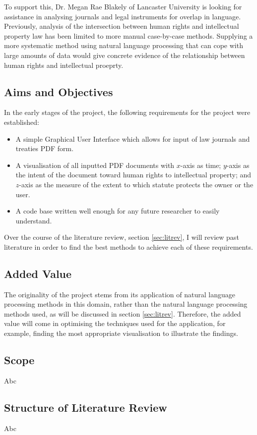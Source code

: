			To support this, Dr. Megan Rae Blakely of Lancaster University is looking for assistance in analysing journals and legal instruments for overlap in language. Previously, analysis of the intersection between human rights and intellectual property law has been limited to more manual case-by-case methods. Supplying a more systematic method using natural language processing that can cope with large amounts of data would give concrete evidence of the relationship between human rights and intellectual proeprty. 
		\subsection{Aims and Objectives}
			In the early stages of the project, the following requirements for the project were established:
			\begin{itemize}
				\item A simple Graphical User Interface which allows for input of law journals and treaties PDF form.
				\item A visualisation of all inputted PDF documents with $x$-axis as time; $y$-axis as the intent of the document toward human rights to intellectual property; and $z$-axis as the measure of the extent to which statute protects the owner or the user.
				\item A code base written well enough for any future researcher to easily understand.
			\end{itemize}
			Over the course of the literature review, section \ref{sec:litrev}, I will review past literature in order to find the best methods to achieve each of these requirements.
		\subsection{Added Value}
			The originality of the project stems from its application of natural language processing methods in this domain, rather than the natural language processing methods used, as will be discussed in section \ref{sec:litrev}. Therefore, the added value will come in optimising the techniques used for the application, for example, finding the most appropriate visualisation to illustrate the findings.
			\newpage
		\subsection{Scope}
			Abc
		\subsection{Structure of Literature Review}
			Abc
